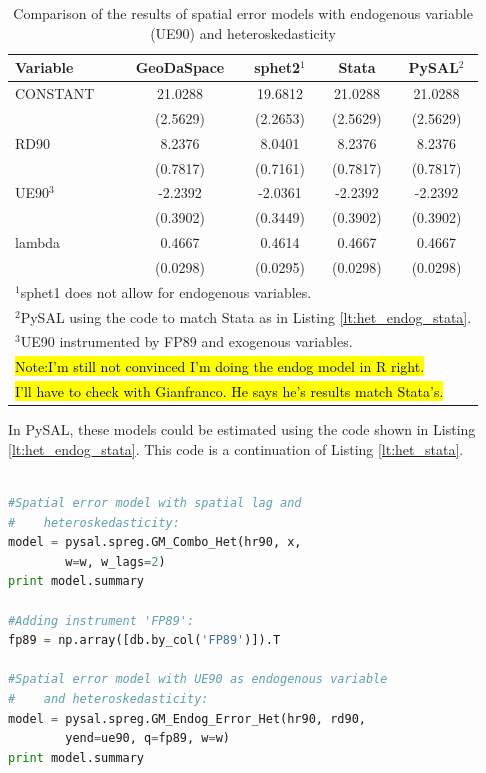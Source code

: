 \documentclass{article}
\begin{document}
\begin{table}[htpb]
\caption{Comparison of the results of spatial error models with endogenous variable (UE90) and heteroskedasticity}
\label{t:res_het_endog}
\centering
\begin{small}
\begin{tabular}{l|cccc} \hline
\textbf{Variable}&\textbf{GeoDaSpace}&\textbf{sphet2$^1$}&\textbf{Stata}&\textbf{PySAL$^2$}\\ \hline
CONSTANT&21.0288&19.6812&21.0288&21.0288\\
&(2.5629)&(2.2653)&(2.5629)&(2.5629)\\
RD90&8.2376&8.0401&8.2376&8.2376\\
&(0.7817)&(0.7161)&(0.7817)&(0.7817)\\
UE90$^3$&-2.2392&-2.0361&-2.2392&-2.2392\\
&(0.3902)&(0.3449)&(0.3902)&(0.3902)\\
lambda&0.4667&0.4614&0.4667&0.4667\\
&(0.0298)&(0.0295)&(0.0298)&(0.0298)\\
\hline
\multicolumn{5}{l}{\scriptsize{$^1$sphet1 does not allow for endogenous variables.}} \\
\multicolumn{5}{l}{\scriptsize{$^2$PySAL using the code to match Stata as in Listing \ref{lt:het_endog_stata}.}} \\
\multicolumn{5}{l}{\scriptsize{$^3$UE90 instrumented by FP89 and exogenous variables.}} \\
\multicolumn{5}{l}{\scriptsize{\hl{Note:I'm still not convinced I'm doing the endog model in R right.}}} \\
\multicolumn{5}{l}{\scriptsize{\hl{I'll have to check with Gianfranco. He says he's results match Stata's.}}} \\
\end{tabular}
\end{small}
\end{table}


In PySAL, these models could be estimated using the code shown in Listing \ref{lt:het_endog_stata}. This code is a continuation of Listing \ref{lt:het_stata}.

\begin{code}
\begin{lstlisting}[label=lt:het_endog_stata,caption=Using PySAL to match the results of spatial error models with heteroskedasticity and endogenous variables or spatial lag from Stata,language=Python]

#Spatial error model with spatial lag and
#    heteroskedasticity:
model = pysal.spreg.GM_Combo_Het(hr90, x,
        w=w, w_lags=2)
print model.summary

#Adding instrument 'FP89':
fp89 = np.array([db.by_col('FP89')]).T

#Spatial error model with UE90 as endogenous variable
#    and heteroskedasticity:
model = pysal.spreg.GM_Endog_Error_Het(hr90, rd90,
        yend=ue90, q=fp89, w=w)
print model.summary

\end{lstlisting}
\end{code}
\FloatBarrier
\end{document}
